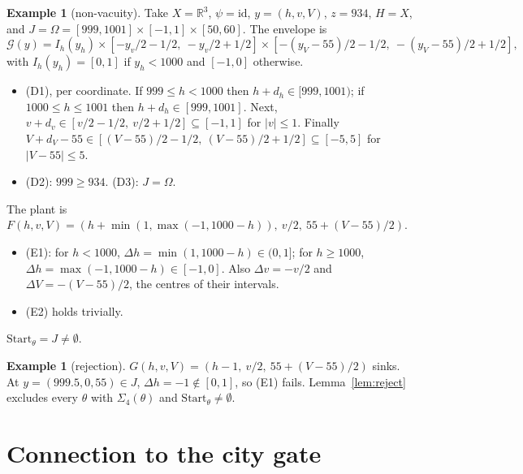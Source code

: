\documentclass[11pt]{article}
\theoremstyle{definition}
\newtheorem{example}[theorem]{Example}
\newcommand{\R}{\mathbb{R}}
\newcommand{\Start}{\ensuremath{\mathrm{Start}}}
\newcommand{\G}{\mathcal{G}}
\begin{document}
\begin{example}[non-vacuity]\label{ex:incl}
Take $X = \R^3$, $\psi = \mathrm{id}$, $y = (h, v, V)$, $z = 934$, $H = X$, and $J = \Omega = [999, 1001] \times [-1, 1] \times [50, 60]$. The envelope is
\[ \G(y) = I_h(y_h) \times [-y_v/2 - 1/2,\ -y_v/2 + 1/2] \times [-(y_V - 55)/2 - 1/2,\ -(y_V - 55)/2 + 1/2], \]
with $I_h(y_h) = [0, 1]$ if $y_h < 1000$ and $[-1, 0]$ otherwise.
\begin{itemize}
\item (D1), per coordinate. If $999 \le h < 1000$ then $h + d_h \in [999, 1001)$; if $1000 \le h \le 1001$ then $h + d_h \in [999, 1001]$. Next, $v + d_v \in [v/2 - 1/2,\ v/2 + 1/2] \subseteq [-1, 1]$ for $|v| \le 1$. Finally $V + d_V - 55 \in [(V - 55)/2 - 1/2,\ (V - 55)/2 + 1/2] \subseteq [-5, 5]$ for $|V - 55| \le 5$.
\item (D2): $999 \ge 934$. (D3): $J = \Omega$.
\end{itemize}
The plant is $F(h, v, V) = (h + \min(1, \max(-1, 1000 - h)),\ v/2,\ 55 + (V - 55)/2)$.
\begin{itemize}
\item (E1): for $h < 1000$, $\Delta h = \min(1, 1000 - h) \in (0, 1]$; for $h \ge 1000$, $\Delta h = \max(-1, 1000 - h) \in [-1, 0]$. Also $\Delta v = -v/2$ and $\Delta V = -(V - 55)/2$, the centres of their intervals.
\item (E2) holds trivially.
\end{itemize}
$\Start_\theta = J \ne \emptyset$.
\end{example}

\begin{example}[rejection]\label{ex:inclnot}
$G(h, v, V) = (h - 1,\ v/2,\ 55 + (V - 55)/2)$ sinks. At $y = (999.5, 0, 55) \in J$, $\Delta h = -1 \notin [0, 1]$, so (E1) fails. Lemma~\ref{lem:reject} excludes every $\theta$ with $\Sigma_4(\theta)$ and $\Start_\theta \ne \emptyset$.
\end{example}

\section{Connection to the city gate}\label{sec:city}
\end{document}
